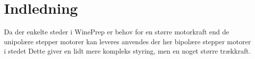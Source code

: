 \chapter{Indledning}

Da der enkelte steder i WinePrep er behov for en større motorkraft end de unipolære stepper motorer kan leveres anvendes der her bipolære stepper motorer i stedet Dette giver en lidt mere kompleks styring, men en noget større trækkraft.